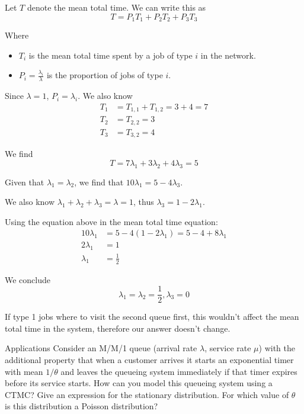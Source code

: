 \begin{solution}
    Let $T$ denote the mean total time. We can write this as
    \[
        T = P_1T_1 + P_2T_2 + P_3T_3
    \]

    Where
    \begin{itemize}
        \item $T_i$ is the mean total time spent by a job of type $i$ in the network.
        \item $P_i=\frac{\lambda_i}{\lambda}$ is the proportion of jobs of type $i$.
    \end{itemize}

    Since $\lambda=1$, $P_i = \lambda_i$. We also know
    \begin{align*}
        T_1 & = T_{1,1} + T_{1,2} = 3 + 4 = 7 \\
        T_2 & = T_{2,2} = 3 \\
        T_3 & = T_{3,2} = 4
    \end{align*}

    We find
    \[
        T = 7\lambda_1 + 3\lambda_2 + 4\lambda_3 = 5
    \]

    Given that $\lambda_1 = \lambda_2$, we find that $10\lambda_1 = 5 - 4\lambda_3$.

    We also know $\lambda_1 + \lambda_2 + \lambda_3 = \lambda = 1$, thus $\lambda_3 = 1 - 2\lambda_1$.

    Using the equation above in the mean total time equation:
    \begin{align*}
        10\lambda_1 &= 5 - 4(1-2\lambda_1) = 5 - 4 + 8\lambda_1 \\
        2\lambda_1  &= 1 \\
        \lambda_1  &= \frac{1}{2}
    \end{align*}

    We conclude
    \[
        \boxed{\lambda_1 = \lambda_2 = \frac{1}{2}, \lambda_3 = 0}
    \]

    If type 1 jobs where to visit the second queue first, this wouldn't affect the mean total time in the system, therefore our answer doesn't change.
\end{solution}

\begin{problem}{Applications}
Consider an M/M/1 queue (arrival rate \( \lambda \), service rate \( \mu \)) with the additional property that when a customer arrives it starts an exponential timer with mean \( 1/\theta \) and leaves the queueing system immediately if that timer expires before its service starts. How can you model this queueing system using a CTMC? Give an expression for the stationary distribution. For which value of \( \theta \) is this distribution a Poisson distribution?
\end{problem}

